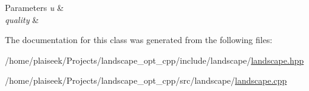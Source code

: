 \begin{DoxyParams}{Parameters}
{\em u} & \\
\hline
{\em quality} & \\
\hline
\end{DoxyParams}


The documentation for this class was generated from the following files\+:\begin{DoxyCompactItemize}
\item 
/home/plaiseek/\+Projects/landscape\+\_\+opt\+\_\+cpp/include/landscape/\hyperlink{landscape_8hpp}{landscape.\+hpp}\item 
/home/plaiseek/\+Projects/landscape\+\_\+opt\+\_\+cpp/src/landscape/\hyperlink{landscape_8cpp}{landscape.\+cpp}\end{DoxyCompactItemize}
